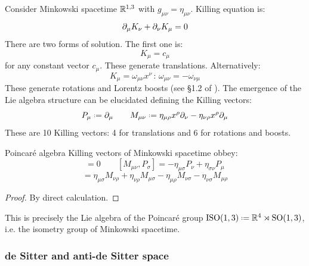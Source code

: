 Consider Minkowski spacetime $ \mathbb{R}^{1,3} $ with $ g_{\mu \nu} = \eta_{\mu \nu} $. Killing equation is:
\begin{equation*}
  \partial_\mu K_\nu + \partial_\nu K_\mu = 0
\end{equation*}
There are two forms of solution. The first one is:
\begin{equation*}
  K_\mu = c_\mu
\end{equation*}
for any constant vector $ c_\mu $. These generate translations. Alternatively:
\begin{equation*}
  K_\mu = \omega_{\mu \nu} x^\nu
  \,:\, \omega_{\mu \nu} = - \omega_{\nu \mu}
\end{equation*}
These generate rotations and Lorentz boosts (see \S 1.2 of \cite{leonardo}). The emergence of the Lie algebra structure can be elucidated defining the Killing vectors:
\begin{equation*}
  P_\mu \defeq \pa_\mu
  \qquad
  M_{\mu \nu} \defeq \eta_{\mu \rho} x^\rho \pa_\nu - \eta_{\nu \rho} x^\rho \pa_\mu
\end{equation*}
These are 10 Killing vectors: 4 for translations and 6 for rotations and boosts.

\begin{proposition}{Poincaré algebra}{}
  Killing vectors of Minkowski spacetime obbey:
  \begin{equation*}
    [P_\mu, P_\nu] = 0
    \qquad
    [M_{\mu \nu}, P_\sigma] = - \eta_{\mu \sigma} P_\nu + \eta_{\sigma \nu} P_\mu
  \end{equation*}
  \begin{equation*}
    [M_{\mu \nu}, M_{\rho \sigma}] = \eta_{\mu \sigma} M_{\nu \rho} + \eta_{\nu \rho} M_{\mu \sigma} - \eta_{\mu \rho} M_{\nu \sigma} - \eta_{\nu \sigma} M_{\mu \rho}
  \end{equation*}
\end{proposition}

\begin{proofbox}
  \begin{proof}
    By direct calculation.
  \end{proof}
\end{proofbox}

This is precisely the Lie algebra of the Poincaré group $ \mathrm{ISO}(1,3) \defeq \R^4 \rtimes \SOn{1,3} $, i.e. the isometry group of Minkowski spacetime.

\subsubsection{de Sitter and anti-de Sitter space}

